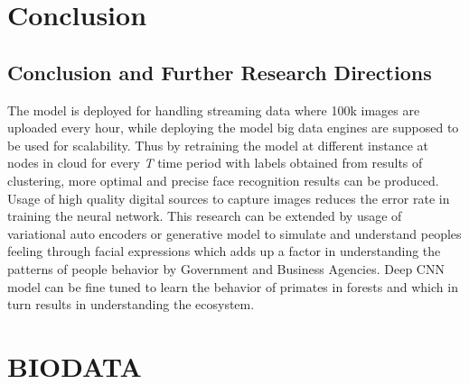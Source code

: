 \documentclass[a4paper,12pt, twoside]{NITKReport}
\begin{document}
\newpage
\chapter{Conclusion}
\label{chap5}
\section{Conclusion and Further Research Directions}
\par The model is deployed for handling streaming data where 100k images are uploaded every hour, while deploying the model big data engines are supposed to be used for scalability. Thus by retraining the model at different instance at nodes in cloud for every \textit{T} time period with labels obtained from results of clustering, more optimal and precise face recognition results can be produced. Usage of high quality digital sources to capture images reduces the error rate in training the neural network. This research can be extended by usage of variational auto encoders or generative model to simulate and understand peoples feeling through facial expressions which adds up a factor in understanding the patterns of people behavior by Government and Business Agencies. Deep CNN model can be fine tuned to learn the behavior of primates in forests and which in turn results in understanding the ecosystem.  
	





\newpage
\pagestyle{plain}
\thispagestyle{empty}
\chapter*{\centering BIODATA}
\end{document}
